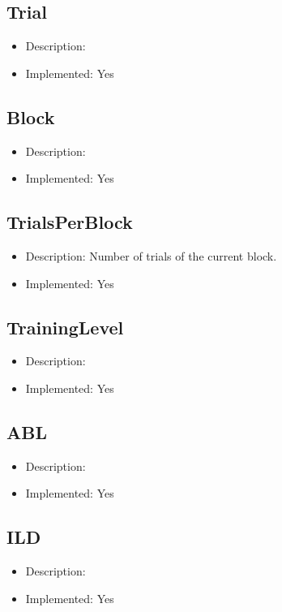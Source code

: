 \subsection*{Trial}
\begin{itemize}
	\item Description: 
	\item Implemented: Yes
\end{itemize}

\subsection*{Block}
\begin{itemize}
	\item Description: 
	\item Implemented: Yes
\end{itemize}

\subsection*{TrialsPerBlock}
\begin{itemize}
	\item Description: Number of trials of the current block.
	\item Implemented: Yes
\end{itemize}

\subsection*{TrainingLevel}
\begin{itemize}
	\item Description: 
	\item Implemented: Yes
\end{itemize}

\subsection*{ABL}
\begin{itemize}
	\item Description: 
	\item Implemented: Yes
\end{itemize}

\subsection*{ILD}
\begin{itemize}
	\item Description: 
	\item Implemented: Yes
\end{itemize}

